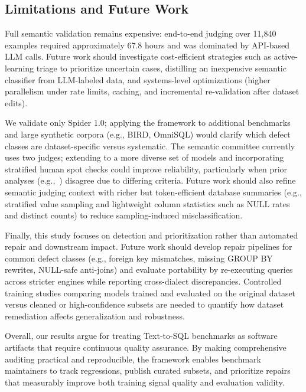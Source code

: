 \documentclass[print]{einformatica}
\begin{document}
\subsection{Limitations and Future Work}

Full semantic validation remains expensive: end-to-end judging over 11,840 examples required approximately 67.8 hours and was dominated by API-based LLM calls. Future work should investigate cost-efficient strategies such as active-learning triage to prioritize uncertain cases, distilling an inexpensive semantic classifier from LLM-labeled data, and systems-level optimizations (higher parallelism under rate limits, caching, and incremental re-validation after dataset edits). 

We validate only Spider 1.0; applying the framework to additional benchmarks and large synthetic corpora (e.g., BIRD, OmniSQL) would clarify which defect classes are dataset-specific versus systematic. The semantic committee currently uses two judges; extending to a more diverse set of models and incorporating stratified human spot checks could improve reliability, particularly when prior analyses (e.g.,~\cite{liu2025nl2sqlbugs}) disagree due to differing criteria. Future work should also refine semantic judging context with richer but token-efficient database summaries (e.g., stratified value sampling and lightweight column statistics such as NULL rates and distinct counts) to reduce sampling-induced misclassification.

Finally, this study focuses on detection and prioritization rather than automated repair and downstream impact. Future work should develop repair pipelines for common defect classes (e.g., foreign key mismatches, missing GROUP BY rewrites, NULL-safe anti-joins) and evaluate portability by re-executing queries across stricter engines while reporting cross-dialect discrepancies. Controlled training studies comparing models trained and evaluated on the original dataset versus cleaned or high-confidence subsets are needed to quantify how dataset remediation affects generalization and robustness.

Overall, our results argue for treating Text-to-SQL benchmarks as software artifacts that require continuous quality assurance. By making comprehensive auditing practical and reproducible, the framework enables benchmark maintainers to track regressions, publish curated subsets, and prioritize repairs that measurably improve both training signal quality and evaluation validity.

\end{document}
